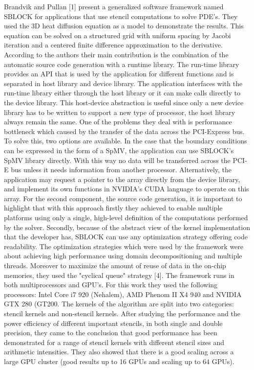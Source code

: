 Brandvik and Pullan [1] present a generalized software framework named SBLOCK for applications that use stencil computations to solve PDE’s. They used the 3D heat diffusion equation as a model to demonstrate the results. This equation can be solved on a structured grid with uniform spacing by Jacobi iteration and a centered finite difference approximation to the derivative. According to the authors their main contribution is the combination of the automatic source code generation with a runtime library. The run-time library provides an API that is used by the application for different functions and is separated in host library and device library. The application interfaces with the run-time library either through the host library or it can make calls directly to the device library. This host-device abstraction is useful since only a new device library has to be written to support a new type of processor, the host library always remain the same. One of the problems they deal with is performance bottleneck which caused by the transfer of the data across the PCI-Express bus. To solve this, two options are available. In the case that the boundary conditions can be expressed in the form of a SpMV, the application can use SBLOCK’s SpMV library directly. With this way no data will be transferred across the PCI-E bus unless it needs information from another processor. Alternatively, the application may request a pointer to the array directly from the device library, and implement its own functions in NVIDIA’s CUDA language to operate on this array. For the second component, the source code generation, it is important to highlight that with this approach firstly they achieved to enable multiple platforms using only a single, high-level definition of the computations performed by the solver. Secondly, because of the abstract view of the kernel implementation that the developer has, SBLOCK can use any optimization strategy offering code readability. The optimization strategies which were used by the framework were about achieving high performance using domain decompositioning and multiple threads. Moreover to maximize the amount of reuse of data in the on-chip memories, they used the "cyclical queue" strategy [4]. The framework runs in both multiprocessors and GPU’s. For this work they used the following processors: Intel Core i7 920 (Nehalem), AMD Phenom II X4 940 and NVIDIA GTX 280 (GT200. The kernels of the algorithm are split into two categories: stencil kernels and non-stencil kernels. After studying the performance and the power efficiency of different important stencils, in both single and double precision, they came to the conclusion that good performance has been demonstrated for a range of stencil kernels with different stencil sizes and arithmetic intensities. They also showed that there is a good scaling across a large GPU cluster (good results up to 16 GPUs and scaling up to 64 GPUs).
